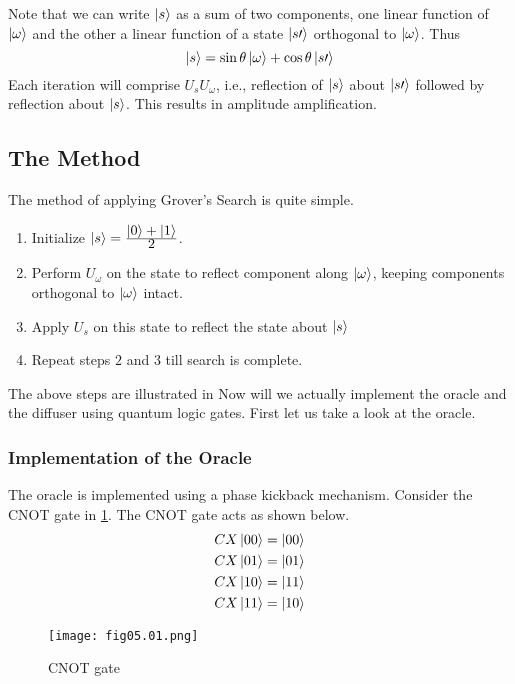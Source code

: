 Note that we can write $\left\vert s\right\rangle$ as a sum of two components, one linear function of $\left\vert \omega\right\rangle$ and the other a linear function of a state $\left\vert s\prime\right\rangle$ orthogonal to $\left\vert \omega\right\rangle$. Thus
\begin{equation}
\label{eq:5.4}
\left\vert s\right\rangle=\sin\theta\left\vert \omega\right\rangle+\cos\theta\left\vert s\prime\right\rangle
\end{equation}
Each iteration will comprise $U_s U_{\omega}$, i.e., reflection of $\left\vert s\right\rangle$ about $\left\vert s\prime\right\rangle$ followed by reflection about $\left\vert s\right\rangle$. This results in amplitude amplification. 

\subsection{The Method}
\noindent The method of applying Grover's Search is quite simple.
\begin{enumerate}
\item Initialize $\left\vert s\right\rangle=\frac{\displaystyle \left\vert 0\right\rangle+\left\vert 1\right\rangle}{\displaystyle 2}$.
\item Perform $U_{\omega}$ on the state to reflect component along $\left\vert \omega\right\rangle$, keeping components orthogonal to $\left\vert \omega\right\rangle$ intact.
\item Apply $U_{s}$ on this state to reflect the state about $\left\vert s\right\rangle$
\item Repeat steps $2$ and $3$ till search is complete.
\end{enumerate}
The above steps are illustrated in %
Now will we actually implement the oracle and the diffuser using quantum logic gates. First let us take a look at the oracle.
\subsubsection*{Implementation of the Oracle}
The oracle is implemented using a phase kickback mechanism. Consider the CNOT gate in \ref{Fig:5.1}. The CNOT gate acts as shown below.
\begin{equation}
\label{eq:5.5}
\begin{split}
&CX\left\vert 00\right\rangle=\left\vert 00\right\rangle\\
&CX\left\vert 01\right\rangle=\left\vert 01\right\rangle\\
&CX\left\vert 10\right\rangle=\left\vert 11\right\rangle\\
&CX\left\vert 11\right\rangle=\left\vert 10\right\rangle\\
\end{split}
\end{equation}
\begin{figure}[!htb]
   \begin{minipage}{\textwidth}
     \centering
     \texttt{[image: fig05.01.png]}
     \caption{CNOT gate}
     \label{Fig:5.1}
   \end{minipage}
\end{figure}

